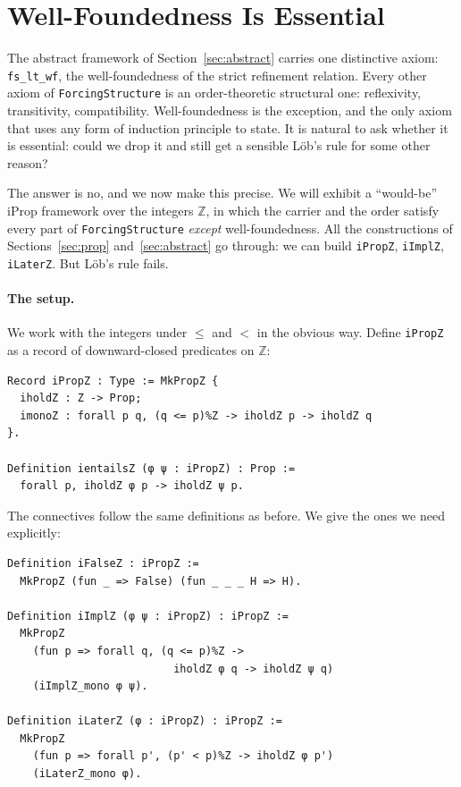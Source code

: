 \section{Well-Foundedness Is Essential}
\label{sec:lob-essential}

The abstract framework of Section~\ref{sec:abstract} carries one
distinctive axiom: \texttt{fs\_lt\_wf}, the well-foundedness of the
strict refinement relation.  Every other axiom of
\texttt{ForcingStructure} is an order-theoretic structural one:
reflexivity, transitivity, compatibility.  Well-foundedness is the
exception, and the only axiom that uses any form of induction
principle to state.  It is natural to ask whether it is essential:
could we drop it and still get a sensible Löb's rule for some other
reason?

The answer is no, and we now make this precise.  We will exhibit a
``would-be'' iProp framework over the integers $\mathbb{Z}$, in which
the carrier and the order satisfy every part of
\texttt{ForcingStructure} \emph{except} well-foundedness.  All the
constructions of Sections~\ref{sec:prop} and~\ref{sec:abstract} go
through: we can build \texttt{iPropZ}, \texttt{iImplZ}, \texttt{iLaterZ}.
But Löb's rule fails.

\paragraph{The setup.}
We work with the integers under $\le$ and $<$ in the obvious way.
Define \texttt{iPropZ} as a record of downward-closed predicates on
$\mathbb{Z}$:

\begin{lstlisting}
Record iPropZ : Type := MkPropZ {
  iholdZ : Z -> Prop;
  imonoZ : forall p q, (q <= p)%Z -> iholdZ p -> iholdZ q
}.

Definition ientailsZ (φ ψ : iPropZ) : Prop :=
  forall p, iholdZ φ p -> iholdZ ψ p.
\end{lstlisting}

\noindent
The connectives follow the same definitions as before.  We give the
ones we need explicitly:

\begin{lstlisting}
Definition iFalseZ : iPropZ :=
  MkPropZ (fun _ => False) (fun _ _ _ H => H).

Definition iImplZ (φ ψ : iPropZ) : iPropZ :=
  MkPropZ
    (fun p => forall q, (q <= p)%Z ->
                          iholdZ φ q -> iholdZ ψ q)
    (iImplZ_mono φ ψ).

Definition iLaterZ (φ : iPropZ) : iPropZ :=
  MkPropZ
    (fun p => forall p', (p' < p)%Z -> iholdZ φ p')
    (iLaterZ_mono φ).
\end{lstlisting}


